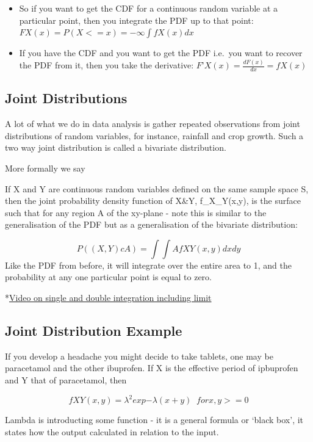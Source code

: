 \documentclass[]{book}
\providecommand{\tightlist}{%
  \setlength{\itemsep}{0pt}\setlength{\parskip}{0pt}}
\theoremstyle{definition}
\theoremstyle{definition}
\theoremstyle{definition}
\theoremstyle{remark}
\begin{document}
\begin{itemize}
\tightlist
\item
  So if you want to get the CDF for a continuous random variable at a
  particular point, then you integrate the PDF up to that point:
  \(FX (x) = P(X <= x) = -∞∫ fX(x)dx\)
\item
  If you have the CDF and you want to get the PDF i.e.~you want to
  recover the PDF from it, then you take the derivative:
  \(F’X(x) = \frac{dF(x)}{dx} = fX(x)\)
\end{itemize}

\subsection{Joint Distributions}\label{joint-distributions}

A lot of what we do in data analysis is gather repeated observations
from joint distributions of random variables, for instance, rainfall and
crop growth. Such a two way joint distribution is called a bivariate
distribution.

More formally we say

If X and Y are continuous random variables defined on the same sample
space S, then the joint probability density function of X\&Y,
f\_X\_Y(x,y), is the surface such that for any region A of the xy-plane
- note this is similar to the generalisation of the PDF but as a
generalisation of the bivariate distribution:

\[P((X,Y) c A) = ∫∫AfXY(x,y)dxdy\] Like the PDF from before, it will
integrate over the entire area to 1, and the probability at any one
particular point is equal to zero.

*\href{https://www.youtube.com/watch?v=w97tr8dafGA}{Video on single and
double integration including limit}

\subsection{Joint Distribution
Example}\label{joint-distribution-example}

If you develop a headache you might decide to take tablets, one may be
paracetamol and the other ibuprofen. If X is the effective period of
ipbuprofen and Y that of paracetamol, then

\[fXY(x,y) = λ^2exp{-λ(x+y)} \; \; for x,y >= 0\]

Lambda is introducting some function - it is a general formula or `black
box', it states how the output calculated in relation to the input.
\end{document}
